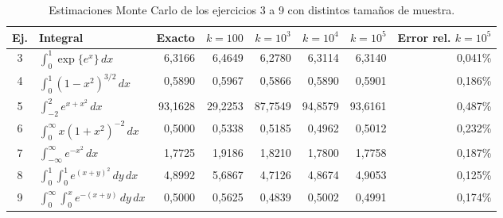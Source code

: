 \begin{table}[H]
\centering
\caption{Estimaciones Monte Carlo de los ejercicios 3 a 9 con distintos tama\~nos de muestra.}
\label{tab:int}
\small\setlength{\tabcolsep}{4pt}
\begin{tabular}{@{}clrrrrrr@{}}
\toprule
Ej. & Integral & Exacto & $k=100$ & $k=10^3$ & $k=10^4$ & $k=10^5$ & \makecell{Error rel.\\$k=10^5$} \\
\midrule
3 & $\int_0^1 \exp\{e^x\}\,dx$ & 6,3166 & 6,4649 & 6,2780 & 6,3114 & 6,3140 & 0,041\% \\
4 & $\int_0^1 (1-x^2)^{3/2}\,dx$ & 0,5890 & 0,5967 & 0,5866 & 0,5890 & 0,5901 & 0,186\% \\
5 & $\int_{-2}^{2} e^{x+x^2}\,dx$ & 93,1628 & 29,2253 & 87,7549 & 94,8579 & 93,6161 & 0,487\% \\
6 & $\int_0^{\infty} x(1+x^2)^{-2}\,dx$ & 0,5000 & 0,5338 & 0,5185 & 0,4962 & 0,5012 & 0,232\% \\
7 & $\int_{-\infty}^{\infty} e^{-x^2}\,dx$ & 1,7725 & 1,9186 & 1,8210 & 1,7800 & 1,7758 & 0,187\% \\
8 & $\int_0^1\!\!\int_0^1 e^{(x+y)^2}\,dy\,dx$ & 4,8992 & 5,6867 & 4,7126 & 4,8674 & 4,9053 & 0,125\% \\
9 & $\int_0^{\infty}\!\!\int_0^{x} e^{-(x+y)}\,dy\,dx$ & 0,5000 & 0,5625 & 0,4839 & 0,5002 & 0,4991 & 0,174\% \\
\bottomrule
\end{tabular}
\end{table}